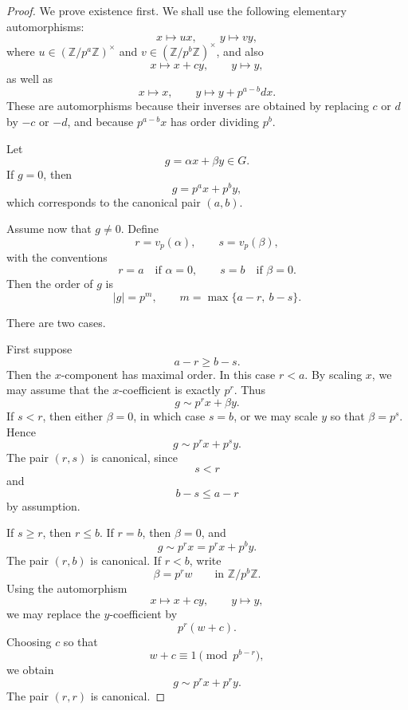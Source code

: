 \begin{proof}
    We prove existence first. We shall use the following elementary automorphisms:
    \[
        x\mapsto ux,\qquad y\mapsto vy,
    \]
    where \(u\in(\mathbb Z/p^a\mathbb Z)^\times\) and
    \(v\in(\mathbb Z/p^b\mathbb Z)^\times\), and also
    \[
        x\mapsto x+cy,\qquad y\mapsto y,
    \]
    as well as
    \[
        x\mapsto x,\qquad y\mapsto y+p^{a-b}dx.
    \]
    These are automorphisms because their inverses are obtained by replacing
    \(c\) or \(d\) by \(-c\) or \(-d\), and because \(p^{a-b}x\) has order
    dividing \(p^b\).
    
    Let
    \[
        g=\alpha x+\beta y\in G.
    \]
    If \(g=0\), then
    \[
        g=p^a x+p^b y,
    \]
    which corresponds to the canonical pair \((a,b)\).
    
    Assume now that \(g\neq 0\). Define
    \[
        r=v_p(\alpha),
        \qquad
        s=v_p(\beta),
    \]
    with the conventions
    \[
        r=a \quad\text{if } \alpha=0,
        \qquad
        s=b \quad\text{if } \beta=0.
    \]
    Then the order of \(g\) is
    \[
        |g|=p^m,
        \qquad
        m=\max\{a-r,\ b-s\}.
    \]
    
    There are two cases.
    
    First suppose
    \[
        a-r\geq b-s.
    \]
    Then the \(x\)-component has maximal order. In this case \(r<a\). By scaling
    \(x\), we may assume that the \(x\)-coefficient is exactly \(p^r\). Thus
    \[
        g\sim p^r x+\beta y.
    \]
    If \(s<r\), then either \(\beta=0\), in which case \(s=b\), or we may scale
    \(y\) so that \(\beta=p^s\). Hence
    \[
        g\sim p^r x+p^s y.
    \]
    The pair \((r,s)\) is canonical, since
    \[
        s<r
    \]
    and
    \[
        b-s\leq a-r
    \]
    by assumption.
    
    If \(s\geq r\), then \(r\leq b\). If \(r=b\), then \(\beta=0\), and
    \[
        g\sim p^r x=p^r x+p^b y.
    \]
    The pair \((r,b)\) is canonical. If \(r<b\), write
    \[
        \beta=p^r w
        \qquad
        \text{in } \mathbb Z/p^b\mathbb Z.
    \]
    Using the automorphism
    \[
        x\mapsto x+cy,
        \qquad
        y\mapsto y,
    \]
    we may replace the \(y\)-coefficient by
    \[
        p^r(w+c).
    \]
    Choosing \(c\) so that
    \[
        w+c\equiv 1\pmod{p^{b-r}},
    \]
    we obtain
    \[
        g\sim p^r x+p^r y.
    \]
    The pair \((r,r)\) is canonical.
    

\end{proof}
